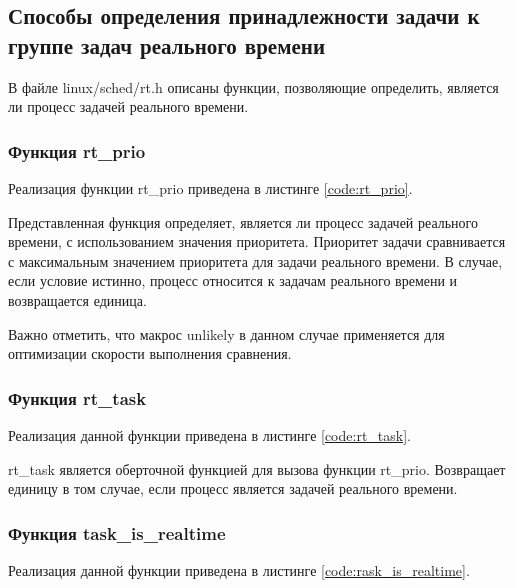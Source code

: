 \subsection{Способы определения принадлежности задачи к группе задач реального времени}
В файле linux/sched/rt.h описаны функции, позволяющие определить, является ли процесс задачей реального времени.

\subsubsection{Функция rt\_prio}
Реализация функции rt\_prio приведена в листинге \ref{code:rt_prio}.


Представленная функция определяет, является ли процесс задачей реального времени, с использованием значения приоритета. Приоритет задачи сравнивается с максимальным значением приоритета для задачи реального времени. В случае, если условие истинно, процесс относится к задачам реального времени и возвращается единица.

Важно отметить, что макрос unlikely в данном случае применяется для оптимизации скорости выполнения сравнения.

\subsubsection{Функция rt\_task}
Реализация данной функции приведена в листинге \ref{code:rt_task}.


rt\_task является оберточной функцией для вызова функции rt\_prio. Возвращает единицу в том случае, если процесс является задачей реального времени.

\subsubsection{Функция task\_is\_realtime}
Реализация данной функции приведена в листинге \ref{code:rask_is_realtime}.


